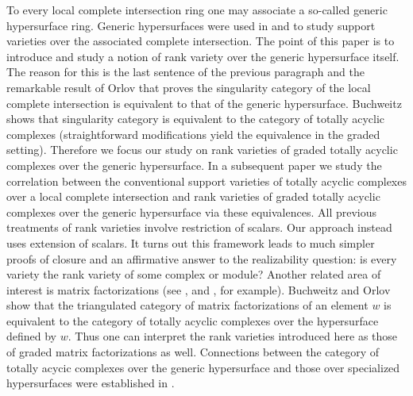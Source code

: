 \documentclass{amsart}[11pt]
\numberwithin{equation}{section}
\theoremstyle{plain}
\newtheorem*{Main Theorem}{Main Theorem}
\theoremstyle{definition}
\theoremstyle{remark}
\numberwithin{equation}{theorem}
\begin{document}
To every local complete intersection ring one may associate a so-called generic hypersurface ring. Generic hypersurfaces were used in \cite[Section 3]{AB} and \cite{J} to study support varieties over the associated complete intersection. The point of this paper is to introduce and study a notion of rank variety over the generic hypersurface itself. The reason for this is the last sentence of the previous paragraph and the remarkable result of Orlov \cite[Theorem 2.1]{O1} that proves the singularity category of the local complete intersection is equivalent to that of the generic hypersurface. Buchweitz \cite{B} shows that singularity category is equivalent to the category of totally acyclic complexes (straightforward modifications yield the equivalence in the graded setting).  Therefore we focus our study on rank varieties of graded totally acyclic complexes over the generic hypersurface. In a subsequent paper we study the correlation between the conventional support varieties of totally acyclic complexes over a local complete intersection and rank varieties of graded totally acyclic complexes over the generic hypersurface via these equivalences. All previous treatments of rank varieties involve restriction of scalars. Our approach instead uses extension of scalars. It turns out this framework leads to much simpler proofs of closure and an affirmative answer to the realizability question: is every variety the rank variety of some complex or module? Another related area of interest is matrix factorizations (see \cite{BW1},\cite{BW2} and \cite{O3}, for example).  Buchweitz \cite{B} and Orlov \cite{O2} show that the triangulated category of matrix factorizations of an element $w$ is equivalent to the category of totally acyclic complexes over the hypersurface defined by $w$. Thus one can interpret the rank varieties introduced here as those of graded matrix factorizations as well. Connections between the category of totally acycic complexes over the generic hypersurface and those over specialized hypersurfaces were established in \cite{J2}.  
\end{document}
